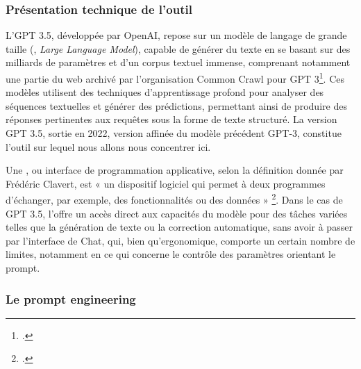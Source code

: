 \subsubsection{Présentation technique de l’outil}

L’\api GPT 3.5, développée par OpenAI, repose sur un modèle de langage de grande taille (\llm, \textit{Large Language Model}), capable de générer du texte en se basant sur des milliards de paramètres et d'un corpus textuel immense, comprenant notamment une partie du web archivé par l’organisation Common Crawl pour GPT 3\footcite[p.8]{brown_language_2020}. Ces modèles utilisent des techniques d’apprentissage profond pour analyser des séquences textuelles et générer des prédictions, permettant ainsi de produire des réponses pertinentes aux requêtes sous la forme de texte structuré. La version GPT 3.5, sortie en 2022, version affinée du modèle précédent GPT-3, constitue l’outil sur lequel nous allons nous concentrer ici. 

\newline
Une \api, ou interface de programmation applicative, selon la définition donnée par Frédéric Clavert, est « un dispositif logiciel qui permet à deux programmes d’échanger, par exemple, des fonctionnalités ou des données » \footcite{clavert_gout_2017}. Dans le cas de GPT 3.5, l’\api offre un accès direct aux capacités du modèle pour des tâches variées telles que la génération de texte ou la correction automatique, sans avoir à passer par l’interface de Chat, qui, bien qu’ergonomique, comporte un certain nombre de limites, notamment en ce qui concerne le contrôle des paramètres orientant le prompt. 

\subsubsection{Le prompt engineering}
\newline

